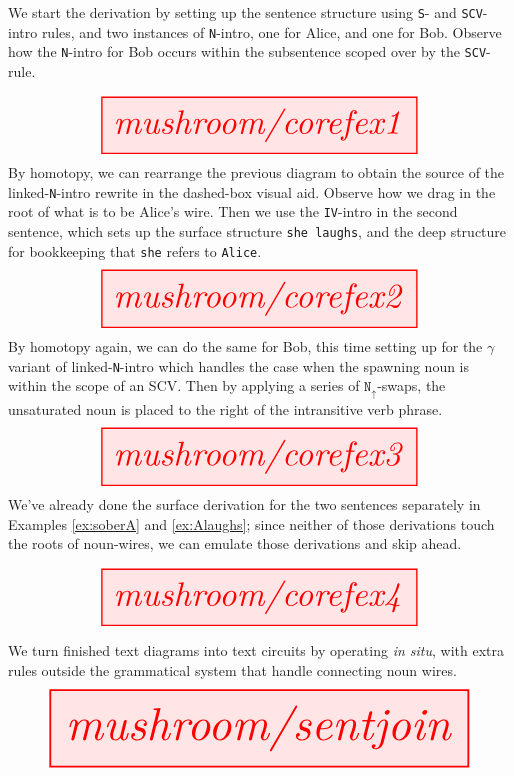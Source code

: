 \begin{myboxR}
\begin{example}\label{ex:corefex1}
We start the derivation by setting up the sentence structure using \texttt{S}- and \texttt{SCV}-intro rules, and two instances of \texttt{N}-intro, one for Alice, and one for Bob. Observe how the \texttt{N}-intro for Bob occurs within the subsentence scoped over by the \texttt{SCV}-rule.
\end{example}
\[
\resizebox{0.75\textwidth}{!}{\tikzfig{mushroom/corefex1}}
\]
By homotopy, we can rearrange the previous diagram to obtain the source of the linked-\texttt{N}-intro rewrite in the dashed-box visual aid. Observe how we drag in the root of what is to be Alice's wire. Then we use the \texttt{IV}-intro in the second sentence, which sets up the surface structure \texttt{she laughs}, and the deep structure for bookkeeping that \texttt{she} refers to \texttt{Alice}.
\[
\resizebox{0.75\textwidth}{!}{\tikzfig{mushroom/corefex2}}
\]
By homotopy again, we can do the same for Bob, this time setting up for the $\gamma$ variant of linked-\texttt{N}-intro which handles the case when the spawning noun is within the scope of an SCV. Then by applying a series of $\texttt{N}_\uparrow$-swaps, the unsaturated noun is placed to the right of the intransitive verb phrase.
\[
\resizebox{0.75\textwidth}{!}{\tikzfig{mushroom/corefex3}}
\]
We've already done the surface derivation for the two sentences separately in Examples \ref{ex:soberA} and \ref{ex:Alaughs}; since neither of those derivations touch the roots of noun-wires, we can emulate those derivations and skip ahead.
\end{myboxR}
\clearpage

\begin{myboxR}

\[
\resizebox{0.75\textwidth}{!}{\tikzfig{mushroom/corefex4}}
\]
\end{myboxR}
\clearpage

\clearpage
\vfill

\begin{myboxB}
\begin{rules}\label{cons:wirejoin}
We turn finished text diagrams into text circuits by operating \emph{in situ}, with extra rules outside the grammatical system that handle connecting noun wires.
\[
\resizebox{\textwidth}{!}{\tikzfig{mushroom/sentjoin}} 
\]
\end{rules}
\end{myboxB}

